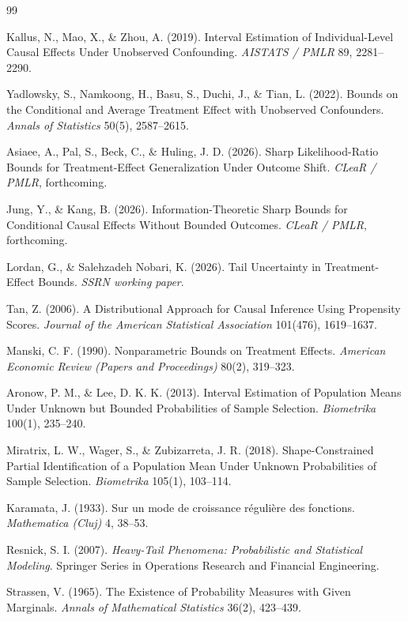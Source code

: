 \documentclass[11pt]{article}
\theoremstyle{definition}
\theoremstyle{plain}
\theoremstyle{remark}
\begin{document}
\begin{thebibliography}{99}

Kallus, N., Mao, X., \& Zhou, A. (2019). Interval Estimation of Individual-Level Causal Effects Under Unobserved Confounding. \emph{AISTATS / PMLR} 89, 2281--2290.

Yadlowsky, S., Namkoong, H., Basu, S., Duchi, J., \& Tian, L. (2022). Bounds on the Conditional and Average Treatment Effect with Unobserved Confounders. \emph{Annals of Statistics} 50(5), 2587--2615.

Asiaee, A., Pal, S., Beck, C., \& Huling, J. D. (2026). Sharp Likelihood-Ratio Bounds for Treatment-Effect Generalization Under Outcome Shift. \emph{CLeaR / PMLR}, forthcoming.

Jung, Y., \& Kang, B. (2026). Information-Theoretic Sharp Bounds for Conditional Causal Effects Without Bounded Outcomes. \emph{CLeaR / PMLR}, forthcoming.

Lordan, G., \& Salehzadeh Nobari, K. (2026). Tail Uncertainty in Treatment-Effect Bounds. \emph{SSRN working paper}.

Tan, Z. (2006). A Distributional Approach for Causal Inference Using Propensity Scores. \emph{Journal of the American Statistical Association} 101(476), 1619--1637.

Manski, C. F. (1990). Nonparametric Bounds on Treatment Effects. \emph{American Economic Review (Papers and Proceedings)} 80(2), 319--323.

Aronow, P. M., \& Lee, D. K. K. (2013). Interval Estimation of Population Means Under Unknown but Bounded Probabilities of Sample Selection. \emph{Biometrika} 100(1), 235--240.

Miratrix, L. W., Wager, S., \& Zubizarreta, J. R. (2018). Shape-Constrained Partial Identification of a Population Mean Under Unknown Probabilities of Sample Selection. \emph{Biometrika} 105(1), 103--114.

Karamata, J. (1933). Sur un mode de croissance régulière des fonctions. \emph{Mathematica (Cluj)} 4, 38--53.

Resnick, S. I. (2007). \emph{Heavy-Tail Phenomena: Probabilistic and Statistical Modeling}. Springer Series in Operations Research and Financial Engineering.

Strassen, V. (1965). The Existence of Probability Measures with Given Marginals. \emph{Annals of Mathematical Statistics} 36(2), 423--439.

\end{thebibliography}
\end{document}

